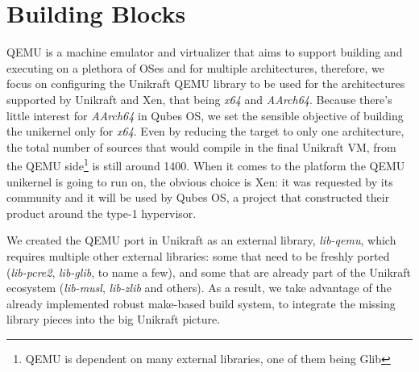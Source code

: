 \chapter{Building Blocks}
\label{chapter:building-blocks}

QEMU \cite{qemu} is a machine emulator and virtualizer that aims to support building and executing on a plethora of OSes and for multiple architectures, therefore, we focus on configuring the Unikraft QEMU library to be used for the architectures supported by Unikraft and Xen, that being \textit{x64} and \textit{AArch64}.
Because there's little interest for \textit{AArch64} in Qubes OS, we set the sensible objective of building the unikernel only for \textit{x64}.
Even by reducing the target to only one architecture, the total number of sources that would compile in the final Unikraft VM, from the QEMU side\footnote{QEMU is dependent on many external libraries, one of them being Glib} is still around 1400.
When it comes to the platform the QEMU unikernel is going to run on, the obvious choice is Xen: it was requested by its community and it will be used by Qubes OS, a project that constructed their product around the type-1 hypervisor.

We created the QEMU port in Unikraft as an external library, \textit{lib-qemu}, which requires multiple other external libraries: some that need to be freshly ported (\textit{lib-pcre2}, \textit{lib-glib}, to name a few), and some that are already part of the Unikraft ecosystem (\textit{lib-musl}, \textit{lib-zlib} and others).
As a result, we take advantage of the already implemented robust make-based build system, to integrate the missing library pieces into the big Unikraft picture.
